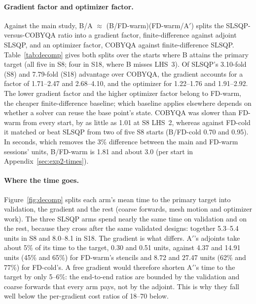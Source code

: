 \paragraph{Gradient factor and optimizer factor.}
Against the main study, B/A $\approx$ (B/FD-warm)(FD-warm/A$'$) splits the
SLSQP-versus-COBYQA ratio into a gradient factor, finite-difference against
adjoint SLSQP, and an optimizer factor, COBYQA against finite-difference
SLSQP. Table~\ref{tab:decomp} gives both splits over the starts where B
attains the primary target (all five in S8; four in S18, where B misses
LHS~3). Of SLSQP's 3.10-fold (S8) and 7.79-fold (S18) advantage over
COBYQA, the gradient accounts for a factor of 1.71--2.47 and 2.68--4.10, and
the optimizer for 1.22--1.76 and 1.91--2.92. The lower gradient factor and
the higher optimizer factor belong to FD-warm, the cheaper finite-difference
baseline; which baseline applies elsewhere depends on whether a solver can
reuse the base point's state. COBYQA was slower than FD-warm from every
start, by as little as 1.01 at S8 LHS~2, whereas against FD-cold it matched
or beat SLSQP from two of five S8 starts (B/FD-cold 0.70 and 0.95). In
seconds, which removes the 3\% difference between the main and FD-warm
sessions' units, B/FD-warm is 1.81 and about 3.0 (per start in
Appendix~\ref{sec:exp2-times}).

\begin{table}[htbp]\centering\small
\caption{The gradient factor and the optimizer factor at the primary
targets: geometric means over the starts where B attains the target (five
in S8, four in S18), each ratio formed within one session's units. The
products close the main study's B/A only approximately, because their
factors come from different sessions.}
\label{tab:decomp}

\end{table}

\paragraph{Where the time goes.}
Figure~\ref{fig:decomp} splits each arm's mean time to the primary target
into validation, the gradient and the rest (coarse forwards, mesh motion
and optimizer work). The three SLSQP arms spend nearly the same time on
validation and on the rest, because they cross after the same validated
designs: together 5.3--5.4 units in S8 and 8.0--8.1 in S18. The gradient is what
differs. A$'$'s adjoints take about 5\% of its time to the target, 0.30 and
0.51 units, against 4.37 and 14.91 units (45\% and 65\%) for FD-warm's
stencils and 8.72 and 27.47 units (62\% and 77\%) for FD-cold's. A free
gradient would therefore shorten A$'$'s time to the target by only 5--6\%:
the end-to-end ratios are bounded by the validation and coarse forwards
that every arm pays, not by the adjoint. This is why they fall well below
the per-gradient cost ratios of 18--70 below.

